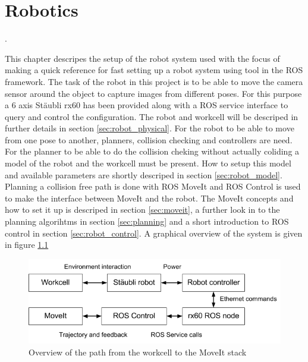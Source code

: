 \chapter{Robotics}
.

This chapter descripes the setup of the robot system used with the focus of making a quick reference for fast setting up a robot system using tool in the ROS framework. The task of the robot in this project is to be able to move the camera sensor around the object to capture images from different poses. For this purpose a 6 axis Stäubli rx60 has been provided along with a ROS service interface to query and control the configuration. The robot and workcell will be descriped in further details in section \ref{sec:robot_physical}. For the robot to be able to move from one pose to another, planners, collision checking and controllers are need. For the planner to be able to do the collision cheking without actually coliding a model of the robot and the workcell must be present. How to setup this model and available parameters are shortly descriped in section \ref{sec:robot_model}. Planning a collision free path is done with ROS MoveIt and ROS Control is used to make the interface between MoveIt and the robot. The MoveIt concepts and how to set it up is descriped in section \ref{sec:moveit}, a further look in to the planning algorihtms in section \ref{sec:planning} and a short introduction to ROS control in section \ref{sec:robot_control}. A graphical overview of the system is given in figure \ref{fig:workcell_to_moveit_path}

\begin{figure}[htb]
	\begin{center}
		\includegraphics[scale=0.5,trim=0 0 0 0]{graphics/05_robotics/workcell_to_moveIt_path.png}%
		\caption{Overview of the path from the workcell to the MoveIt stack}
		\label{fig:workcell_to_moveit_path}
	\end{center}
\end{figure}

